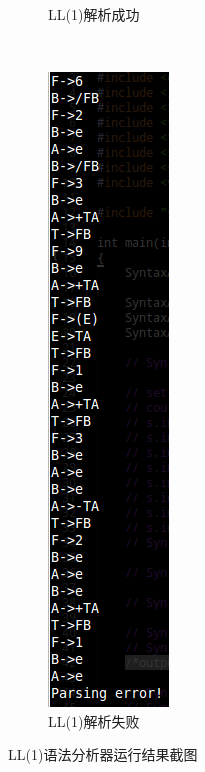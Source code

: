 \documentclass{article}
\begin{document}
\begin{CJK*}{UTF8}{gbsn}
\begin{figure}
\begin{subfigure}[b]{0.25\textwidth}
                \caption{LL(1)解析成功}
                \label{fig:ll1yes}
        \end{subfigure}
        ~ %
        \begin{subfigure}[b]{0.25\textwidth}
                \includegraphics[width=\textwidth]{ll1no.png}
                \caption{LL(1)解析失败}
                \label{fig:ll1no}
        \end{subfigure}
        \caption{LL(1)语法分析器运行结果截图}\label{fig:ll1screenshot}
\end{figure}


\end{CJK*}
\end{document}
